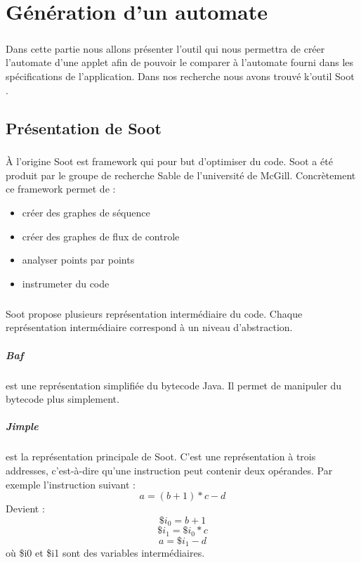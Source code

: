 \chapter{Génération d'un automate}

\paragraph{}
Dans cette partie nous allons présenter l'outil qui nous permettra de créer l'automate d'une applet afin de pouvoir le comparer à l'automate fourni dans les spécifications de l'application. Dans nos recherche nous avons trouvé k'outil Soot \cite{Soot}.

\section{Présentation de Soot}

\paragraph{}
À l'origine Soot est framework qui pour but d'optimiser du code. Soot a été produit par le groupe de recherche Sable de l'université de McGill. Concrètement ce framework permet de :

\begin{itemize}
	\item créer des graphes de séquence
	\item créer des graphes de flux de controle
	\item analyser points par points
	\item instrumeter du code
\end{itemize}

\paragraph{}
Soot propose plusieurs représentation intermédiaire du code. Chaque représentation intermédiaire correspond à un niveau d'abstraction.

\paragraph{Baf} est une représentation simplifiée du bytecode Java. Il permet de manipuler du bytecode plus simplement.
\paragraph{Jimple} est la représentation principale de Soot. C'est une représentation à trois addresses, c'est-à-dire qu'une instruction peut contenir deux opérandes. Par exemple l'instruction suivant : 
$$ a = (b + 1) * c - d$$
Devient : 
$$ \$i_0 = b + 1$$
$$ \$i_1 = \$i_0 * c$$
$$ a = \$i_1 - d$$
où \$i0 et \$i1 sont des variables intermédiaires.


